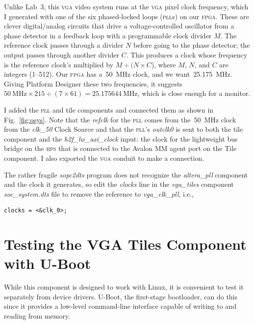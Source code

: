 \documentclass[11pt]{article}
\newcommand{\figref}[1]{Fig.~\ref{fig:#1}}
\begin{document}
\vspace{-0.5\baselineskip}

Unlike Lab~3, this \textsc{vga} video system runs at the \textsc{vga}
pixel clock frequency, which I generated with one of the six
phased-locked loops (\textsc{pll}s) on our \textsc{fpga}.  These are
clever digital/analog circuits that drive a voltage-controlled
oscillator from a phase detector in a feedback loop with a
programmable clock divider $M$. The reference clock passes through a
divider $N$ before going to the phase detector; the output passes
through another divider $C$.  This produces a clock whose frequency is
the reference clock's multiplied by $M \div (N \times C$), where $M$,
$N$, and $C$ are integers (1--512).  Our \textsc{fpga} has a~50~MHz
clock, and we want~25.175~MHz.  Giving Platform Designer these two
frequencies, it suggests $50\ \text{MHz} \times 215 \div (7 \times 61)
= 25.175644\ \text{MHz}$, which is close enough for a monitor.

I added the \textsc{pll} and tile components and connected them as
shown in \figref{qsys}.  Note that the \emph{refclk} for the
\textsc{pll} comes from the~50~MHz clock from the \emph{clk\_50} Clock
Source and that the \textsc{pll}'s \emph{outclk0} is sent to both the
tile component and the \emph{h2f\_lw\_axi\_clock} input: the clock for
the lightweight bus bridge on the \textsc{hps} that is connected to
the Avalon MM agent port on the Tile component.  I also exported the
\textsc{vga} conduit to make a connection.

The rather fragile \emph{sopc2dts} program does not recognize the
\emph{altera\_pll} component and the clock it generates,
so edit the \emph{clocks} line in the \emph{vga\_tiles} component
\emph{soc\_system.dts} file to remove the reference to \emph{vga\_clk\_pll},
i.e.,

\begin{verbatim}
clocks = <&clk_0>;
\end{verbatim}


\section{Testing the VGA Tiles Component with U-Boot}

While this component is designed to work with Linux, it is convenient
to test it separately from device drivers.  U-Boot, the first-stage
bootloader, can do this since it provides a low-level command-line
interface capable of writing to and reading from memory.
\end{document}

